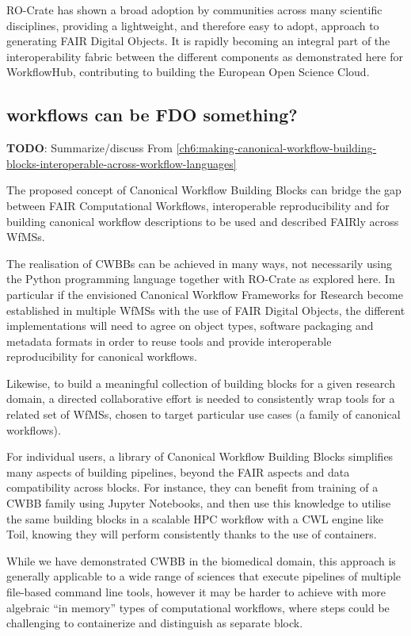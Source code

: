 RO-Crate has shown a broad adoption by communities across many
scientific disciplines, providing a lightweight, and therefore easy to
adopt, approach to generating FAIR Digital Objects. It is rapidly
becoming an integral part of the interoperability fabric between the
different components as demonstrated here for WorkflowHub, contributing
to building the European Open Science Cloud.


\subsection{workflows can be FDO something?}

\textbf{TODO}: Summarize/discuss 
From \vref{ch6:making-canonical-workflow-building-blocks-interoperable-across-workflow-languages}

The proposed concept of Canonical Workflow Building Blocks can bridge
the gap between FAIR Computational Workflows, interoperable
reproducibility and for building canonical workflow descriptions to be
used and described FAIRly across WfMSs.

The realisation of CWBBs can be achieved in many ways, not necessarily
using the Python programming language together with RO-Crate as explored
here. In particular if the envisioned Canonical Workflow Frameworks for
Research become established in multiple WfMSs with the use of FAIR
Digital Objects, the different implementations will need to agree on
object types, software packaging and metadata formats in order to reuse
tools and provide interoperable reproducibility for canonical workflows.

Likewise, to build a meaningful collection of building blocks for a
given research domain, a directed collaborative effort is needed to
consistently wrap tools for a related set of WfMSs, chosen to target
particular use cases (a family of canonical workflows).

For individual users, a library of Canonical Workflow Building Blocks
simplifies many aspects of building pipelines, beyond the FAIR aspects
and data compatibility across blocks. For instance, they can benefit
from training of a CWBB family using Jupyter Notebooks, and then use
this knowledge to utilise the same building blocks in a scalable HPC
workflow with a CWL engine like Toil, knowing they will perform
consistently thanks to the use of containers.

While we have demonstrated CWBB in the biomedical domain, this approach
is generally applicable to a wide range of sciences that execute
pipelines of multiple file-based command line tools, however it may be
harder to achieve with more algebraic ``in memory'' types of
computational workflows, where steps could be challenging to
containerize and distinguish as separate block.

